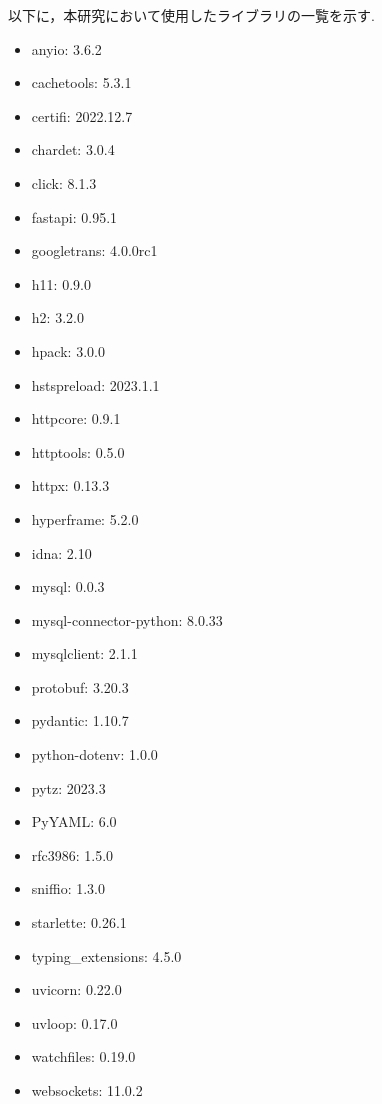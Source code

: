 \documentclass[b5paper,12pt,dvipdfmx]{jsreport}
\begin{document}
以下に，本研究において使用したライブラリの一覧を示す.
\begin{itemize}
    \item anyio: 3.6.2
    \item cachetools: 5.3.1
    \item certifi: 2022.12.7
    \item chardet: 3.0.4
    \item click: 8.1.3
    \item fastapi: 0.95.1
    \item googletrans: 4.0.0rc1
    \item h11: 0.9.0
    \item h2: 3.2.0
    \item hpack: 3.0.0
    \item hstspreload: 2023.1.1
    \item httpcore: 0.9.1
    \item httptools: 0.5.0
    \item httpx: 0.13.3
    \item hyperframe: 5.2.0
    \item idna: 2.10
    \item mysql: 0.0.3
    \item mysql-connector-python: 8.0.33
    \item mysqlclient: 2.1.1
    \item protobuf: 3.20.3
    \item pydantic: 1.10.7
    \item python-dotenv: 1.0.0
    \item pytz: 2023.3
    \item PyYAML: 6.0
    \item rfc3986: 1.5.0
    \item sniffio: 1.3.0
    \item starlette: 0.26.1
    \item typing\_extensions: 4.5.0
    \item uvicorn: 0.22.0
    \item uvloop: 0.17.0
    \item watchfiles: 0.19.0
    \item websockets: 11.0.2
\end{itemize}

\end{document}
